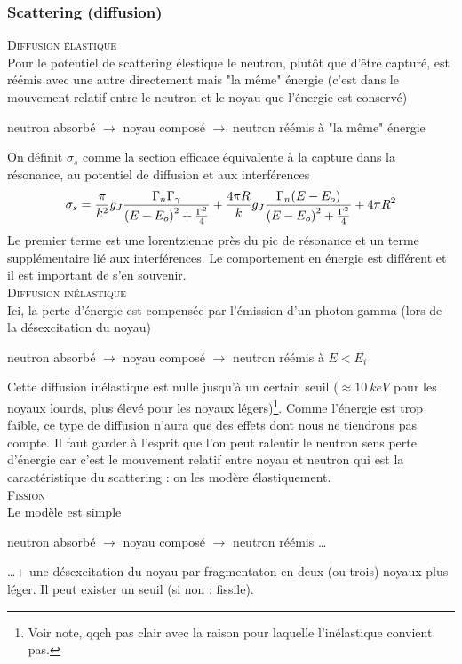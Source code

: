 \subsubsection{Scattering (diffusion)}
\textsc{Diffusion élastique}\\
Pour le potentiel de scattering élestique le neutron, plutôt que d'être capturé, est réémis avec 
une autre directement mais "la même" énergie (c'est dans le mouvement relatif entre le neutron 
et le noyau que l'énergie est conservé)
\begin{center}
neutron absorbé $\longrightarrow$ noyau composé $\longrightarrow$ neutron réémis à "la même" énergie
\end{center}
On définit $\sigma_s$ comme la section efficace équivalente à la capture dans la résonance, au 
potentiel de diffusion et aux interférences
\begin{equation}
{\sigma _s} = \frac{\pi }{{{k^2}}}{g_J}\frac{{{\Gamma _n}{\Gamma _\gamma }}}{{{{(E - {E_o})}^2} + {\textstyle{{{\Gamma ^2}} \over 4}}}} + \frac{{4\pi R}}{k}{g_J}\frac{{{\Gamma _n}(E - {E_o})}}{{{{(E - {E_o})}^2} + {\textstyle{{{\Gamma ^2}} \over 4}}}} + 4\pi {R^2}
\end{equation}
Le premier terme est une lorentzienne près du pic de résonance et un terme supplémentaire lié aux 
interférences. Le comportement en énergie est différent et il est important de s'en souvenir. \\

\textsc{Diffusion inélastique}\\
Ici, la perte d'énergie est compensée par l'émission d'un photon gamma (lors de la désexcitation 
du noyau)
\begin{center}
neutron absorbé $\longrightarrow$ noyau composé $\longrightarrow$ neutron réémis à $E<E_i$
\end{center}
Cette diffusion inélastique est nulle jusqu'à un certain seuil ($\approx 10\ keV$ pour les 
noyaux lourds, plus élevé pour les noyaux légers)\footnote{Voir note, qqch pas clair avec la 
raison pour laquelle l'inélastique convient pas.}. Comme l'énergie est trop faible, ce type de 
diffusion n'aura que des effets dont nous ne tiendrons pas compte. Il faut garder à l'esprit que 
l'on peut ralentir le neutron sens perte d'énergie car c'est le mouvement relatif entre noyau et 
neutron qui est la caractéristique du scattering : on les modère élastiquement.\\

\textsc{Fission}\\
Le modèle est simple
\begin{center}
neutron absorbé $\longrightarrow$ noyau composé $\longrightarrow$ neutron réémis \dots
\end{center}
\dots + une désexcitation du noyau par fragmentaton en deux (ou trois) noyaux plus léger. Il 
peut exister un seuil (si non : fissile).




